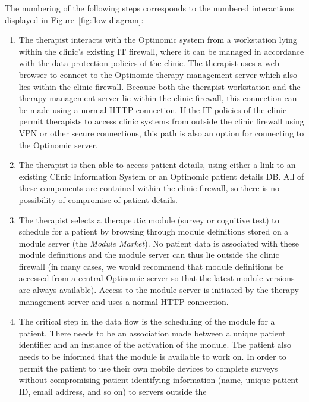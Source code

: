 \documentclass[DIV=calc,paper=a4,fontsize=11pt,twocolumn]{scrartcl}
\begin{document}
The numbering of the following steps corresponds to the numbered
interactions displayed in Figure~\ref{fig:flow-diagram}:

\begin{enumerate}
  \item{The therapist interacts with the Optinomic system from a
    workstation lying within the clinic's existing IT firewall, where
    it can be managed in accordance with the data protection policies
    of the clinic.  The therapist uses a web browser to connect to the
    Optinomic therapy management server which also lies within the
    clinic firewall.  Because both the therapist workstation and the
    therapy management server lie within the clinic firewall, this
    connection can be made using a normal HTTP connection.  If the IT
    policies of the clinic permit therapists to access clinic systems
    from outside the clinic firewall using VPN or other secure
    connections, this path is also an option for connecting to the
    Optinomic server.}
  \item{The therapist is then able to access patient details, using
    either a link to an existing Clinic Information System or an
    Optinomic patient details DB.  All of these components are
    contained within the clinic firewall, so there is no possibility
    of compromise of patient details.}
  \item{The therapist selects a therapeutic module (survey or
    cognitive test) to schedule for a patient by browsing through
    module definitions stored on a module server (the \emph{Module
      Market}).  No patient data is associated with these module
    definitions and the module server can thus lie outside the clinic
    firewall (in many cases, we would recommend that module
    definitions be accessed from a central Optinomic server so that
    the latest module versions are always available).  Access to the
    module server is initiated by the therapy management server and
    uses a normal HTTP connection.}
  \item{The critical step in the data flow is the scheduling of the
    module for a patient.  There needs to be an association made
    between a unique patient identifier and an instance of the
    activation of the module.  The patient also needs to be informed
    that the module is available to work on.  In order to permit the
    patient to use their own mobile devices to complete surveys
    without compromising patient identifying information (name, unique
    patient ID, email address, and so on) to servers outside the
}
\end{enumerate}
\end{document}
